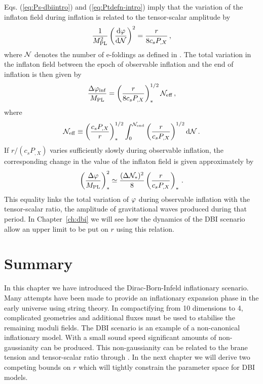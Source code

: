 Eqs. (\ref{eq:Ps-dbiintro}) and (\ref{eq:Ptdefn-intro}) imply 
that the variation of the inflaton field during inflation  
is related to the tensor-scalar amplitude by \cite{lyth,bmpaper}
% 
\begin{equation}
\label{eq:genlyth-dbiintro}
\frac{1}{M_{\mathrm{PL}}^2}
\left( \frac{\mathrm{d} \varphi}{\mathrm{d} \mathcal{N}} \right)^2 = \frac{r}{8 c_s P_{,X}}
\,,
\end{equation}
% 
where $\mathcal{N}$ denotes the number of e-foldings as defined in
.
The total variation in the inflaton field between the epoch of observable 
inflation and the end of inflation is then given by
% 
\begin{equation}
\label{eq:totalfield-dbiintro}
\frac{\Delta \varphi_{\rm inf}}{M_{\mathrm{PL}}} = 
\left( \frac{r}{8 c_s P_{,X}} \right)_*^{1/2} \mathcal{N}_\mathrm{eff} \,,
\end{equation}
% 
where
% 
\begin{equation}
\label{eq:Neff-dbiintro}
\mathcal{N}_\mathrm{eff} \equiv \left( \frac{c_sP_{,X}}{r}\right)_*^{1/2}
\int_0^{\mathcal{N}_{\rm end}}  
\left( \frac{r}{c_sP_{,X}} \right)^{1/2} \mathrm{d} \mathcal{N} \,.
\end{equation}
% 
If $r/(c_s P_{,X})$ varies 
sufficiently slowly during observable inflation, 
the corresponding change in the value of the inflaton  
field is given approximately by \cite{lyth,bmpaper}
% 
\begin{equation}
\label{eq:approxlyth-dbiintro}
\left( \frac{\Delta \varphi}{M_{\mathrm{PL}}} \right)_*^2 \simeq 
\frac{(\Delta \mathcal{N}_*)^2}{8} \left( \frac{r}{c_sP_{,X}} \right)_* \,.
\end{equation}
% 
This equality links the total variation of $\varphi$ during observable inflation
with the tensor-scalar ratio, \ie the amplitude of gravitational waves produced
during that period. In Chapter~\ref{ch:dbi} we will see how the dynamics of the
DBI scenario allow an upper limit to be put on $r$ using this relation.

\section{Summary}
\label{sec:summary-dbiintro}
In this chapter we have introduced the Dirac-Born-Infeld inflationary scenario.
Many attempts have been made to provide an inflationary expansion phase in the
early universe using string theory. In compactifying from 10 dimensions to 4,
complicated geometries and additional fluxes must be used to stabilise the
remaining moduli fields. 
The DBI scenario is an example of a non-canonical inflationary model. With a
small sound speed significant amounts of non-gaussianity can be produced. This
non-gaussianity can be related to the brane tension and tensor-scalar ratio
through . In the next chapter we will derive two
competing bounds on $r$ which will tightly constrain the parameter space for
DBI models.

